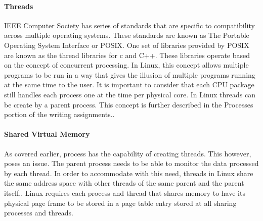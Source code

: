 \documentclass[journal,10pt,onecolumn,compsoc,letterpaper,draftclsnofoot,table,xcdraw]{IEEEtran} \usepackage[margin=0.75in]{geometry}
\begin{document}
\paragraph{Threads} IEEE Computer Society has series of standards that are specific to compatibility across multiple operating systems. These standards are known as The Portable Operating System Interface or POSIX. One set of libraries provided by POSIX are known as the thread libraries for c and C++. These libraries operate based on the concept of concurrent processing. In Linux, this concept allows multiple programs to be run in  a way that gives the illusion of multiple programs running at the same time to the user. It is important to consider that each CPU package still handles each process one at the time per physical core. In Linux threads can be create by a parent process. This concept is further described in the Processes portion of the writing assignments.\cite{2-3}.
\paragraph{Shared Virtual Memory} \label{SVM} As covered earlier, process has the capability of creating threads. This however, poses an issue. The parent process needs to be able to monitor the data processed by each thread. In order to accommodate with this need, threads in Linux share the same address space with other threads of the same parent and the parent itself.\cite{2-1}. Linux requires each process and thread that shares memory to have its physical page frame to be stored in a page table entry stored at all sharing processes and threads.\cite{2-1}
\end{document}

